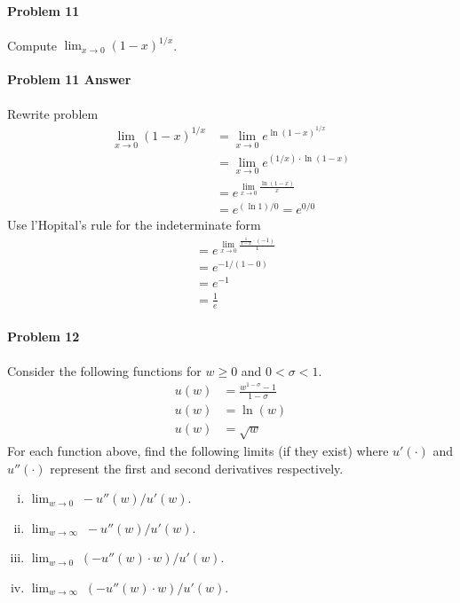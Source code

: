 \documentclass[a4paper, 11pt]{article}
\begin{document}

\paragraph{Problem 11}
Compute $\lim_{x \rightarrow 0 } (1-x)^{1/x}$.


\paragraph{Problem 11 Answer}
Rewrite problem
\begin{align}
    \lim_{x\rightarrow 0} (1-x)^{1/x} &= \lim_{x\rightarrow 0} e^{\ln(1-x)^{1/x}}  \nonumber \\
    &= \lim_{x\rightarrow 0} e^{(1/x)\cdot \ln(1-x)} \nonumber \\
    &= e^{\lim_{x\rightarrow 0} \frac{\ln(1-x)}{x} } \nonumber \\
    &= e^{(\ln 1)/0} = e^{0/0} \nonumber
\end{align}
Use l'Hopital's rule for the indeterminate form
\begin{align}
    &= e^{\lim_{x\rightarrow 0} \frac{\frac{1}{1-x} \cdot (-1)}{1} }  \nonumber \\
    &= e^{-1/(1-0)} \nonumber \\
    &= e^{-1} \nonumber \\
    &= \frac{1}{e} \nonumber 
\end{align}

\paragraph{Problem 12}
Consider the following functions for $w \geq 0$ and $0 < \sigma < 1$.
\begin{align}
    u(w) &= \frac{w^{1-\sigma}-1}{1-\sigma}  \nonumber \\
    u(w) &= \ln(w) \nonumber \nonumber \\
    u(w) &= \sqrt{w} \nonumber 
\end{align}
For each function above, find the following limits (if they exist) where $u'(\cdot)$ and $u''(\cdot)$ represent the first and second derivatives respectively.
\begin{enumerate}[(i)]
	\item $\lim_{w\rightarrow 0} \; -u''(w)/u'(w)$.
	\item $\lim_{w\rightarrow \infty} \; -u''(w)/u'(w)$.
	\item $\lim_{w\rightarrow 0} \; (-u''(w)\cdot w)/u'(w)$.
	\item $\lim_{w\rightarrow \infty} \; (-u''(w)\cdot w)/u'(w)$.
\end{enumerate}
\end{document}
